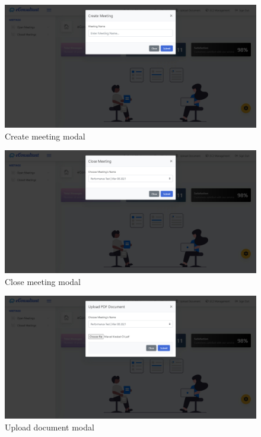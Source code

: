 \documentclass{article}
\begin{document}
\begin{figure}[H]
  \centering
  \includegraphics[scale=0.295]{implementation/createMeeting.jpg}
  \caption{Create meeting modal}
  \label{fig:createMeeting}
\end{figure}

\begin{figure}[H]
  \centering
  \includegraphics[scale=0.295]{implementation/closeMeeting.jpg}
  \caption{Close meeting modal}
  \label{fig:closeMeeting}
\end{figure}

\begin{figure}[H]
  \centering
  \includegraphics[scale=0.295]{implementation/uploadDocument.jpg}
  \caption{Upload document modal}
  \label{fig:uploadDocument}
\end{figure}
\end{document}
